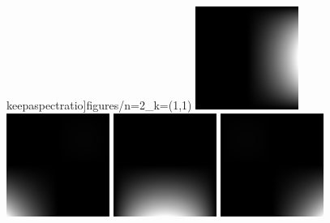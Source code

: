 \documentclass[11pt, a4paper]{book}
\begin{document}
\begin{figure}[htbp]
  keepaspectratio]{figures/n=2_k=(1,1)}
  \includegraphics[width=0.3\textwidth, height=\textheight,
  keepaspectratio]{figures/n=2_k=(1,2)}
  \includegraphics[width=0.3\textwidth, height=\textheight,
  keepaspectratio]{figures/n=2_k=(2,0)}
  \includegraphics[width=0.3\textwidth, height=\textheight,
  keepaspectratio]{figures/n=2_k=(2,1)}
  \includegraphics[width=0.3\textwidth, height=\textheight,
  keepaspectratio]{figures/n=2_k=(2,2)}
  \caption{}
  \label{fig:lagrange-shape-functions}
\end{figure}
\end{document}
